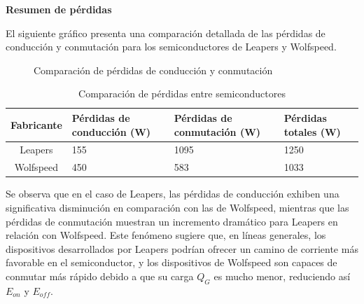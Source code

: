 \textbf{Resumen de pérdidas}

El siguiente gráfico presenta una comparación detallada de las pérdidas de conducción y conmutación para los semiconductores de Leapers y Wolfspeed.

\begin{figure}[H]
	\centering
	\caption{Comparación de pérdidas de conducción y conmutación}
	\label{fig:loss_comparison}
\end{figure}

\begin{table}[H]
	\centering
	\begin{tabular}{|c|p{3.5cm}|p{3.5cm}|p{3.5cm}|}
		\hline
		\textbf{Fabricante} & \textbf{Pérdidas de conducción (W)} & \textbf{Pérdidas de conmutación (W)} & \textbf{Pérdidas totales (W)} \\
		\hline
		Leapers & 155 & 1095 & 1250 \\
		\hline
		Wolfspeed & 450 & 583 & 1033 \\
		\hline
	\end{tabular}
	\caption{Comparación de pérdidas entre semiconductores}
\end{table}

Se observa que en el caso de Leapers, las pérdidas de conducción exhiben una significativa disminución en comparación con las de Wolfspeed, mientras que las pérdidas de conmutación muestran un incremento dramático para Leapers en relación con Wolfspeed. Este fenómeno sugiere que, en líneas generales, los dispositivos desarrollados por Leapers podrían ofrecer un camino de corriente más favorable en el semiconductor, y los dispositivos de Wolfspeed son capaces de conmutar más rápido debido a que su carga $Q_G$ es mucho menor, reduciendo así $E_{on}$ y $E_{off}$.

